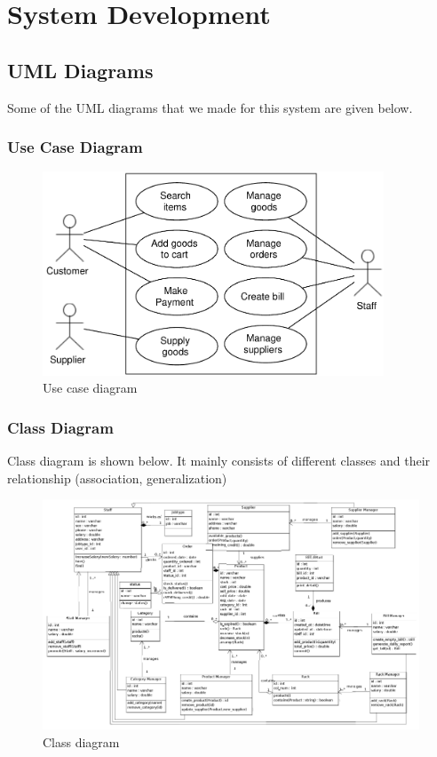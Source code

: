 \section{System Development}

\subsection{UML Diagrams}

Some of the UML diagrams that we made for this system are given below.

\subsubsection{Use Case Diagram}

\begin{figure}[h!]\centering
  \includegraphics[width=4in]{fig/use-case}
  \caption{Use case diagram}\label{fig:use-case}
\end{figure}

\subsubsection{Class Diagram}

Class diagram is shown below. It mainly consists of different classes and their
relationship (association, generalization)

\begin{figure}[h!]\centering
  \includegraphics[width=\textwidth]{fig/class}
  \caption{Class diagram}\label{fig:class}
\end{figure}


